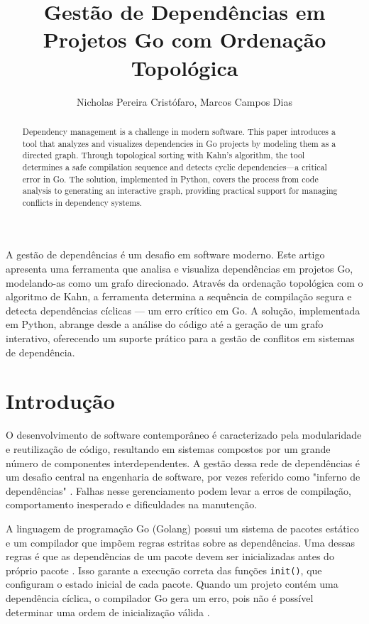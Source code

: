 \documentclass[12pt]{article}
\title{Gestão de Dependências em Projetos Go com Ordenação Topológica}
\author{Nicholas Pereira Cristófaro\inst{1}, Marcos Campos Dias\inst{1}}
\begin{document}
\maketitle

\begin{resumo}
A gestão de dependências é um desafio em software moderno. Este artigo apresenta uma ferramenta que analisa e visualiza dependências em projetos Go, modelando-as como um grafo direcionado. Através da ordenação topológica com o algoritmo de Kahn, a ferramenta determina a sequência de compilação segura e detecta dependências cíclicas — um erro crítico em Go. A solução, implementada em Python, abrange desde a análise do código até a geração de um grafo interativo, oferecendo um suporte prático para a gestão de conflitos em sistemas de dependência.
\end{resumo}

\begin{abstract}
Dependency management is a challenge in modern software. This paper introduces a tool that analyzes and visualizes dependencies in Go projects by modeling them as a directed graph. Through topological sorting with Kahn's algorithm, the tool determines a safe compilation sequence and detects cyclic dependencies—a critical error in Go. The solution, implemented in Python, covers the process from code analysis to generating an interactive graph, providing practical support for managing conflicts in dependency systems.
\end{abstract}

\section{Introdução}

O desenvolvimento de software contemporâneo é caracterizado pela modularidade e reutilização de código, resultando em sistemas compostos por um grande número de componentes interdependentes. A gestão dessa rede de dependências é um desafio central na engenharia de software, por vezes referido como "inferno de dependências" \cite{jergensen2011}. Falhas nesse gerenciamento podem levar a erros de compilação, comportamento inesperado e dificuldades na manutenção.

A linguagem de programação Go (Golang) possui um sistema de pacotes estático e um compilador que impõem regras estritas sobre as dependências. Uma dessas regras é que as dependências de um pacote devem ser inicializadas antes do próprio pacote \cite{donovan2015go}. Isso garante a execução correta das funções \texttt{init()}, que configuram o estado inicial de cada pacote. Quando um projeto contém uma dependência cíclica, o compilador Go gera um erro, pois não é possível determinar uma ordem de inicialização válida \cite{GoSpec}.
\end{document}
